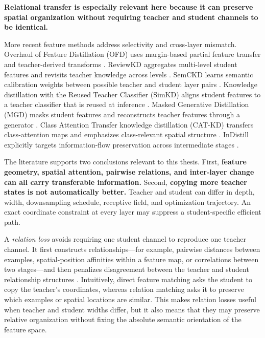 \textbf{Relational transfer is especially relevant here because it can preserve
spatial organization without requiring teacher and student channels to be
identical.}

More recent feature methods address selectivity and cross-layer mismatch.
Overhaul of Feature Distillation (OFD)
uses margin-based partial feature transfer and teacher-derived transforms
\cite{heo2019ofd}. ReviewKD aggregates multi-level student features and
revisits teacher knowledge across levels \cite{chen2021reviewkd}. SemCKD learns
semantic calibration weights between possible teacher and student layer pairs
\cite{chen2021semckd}. Knowledge distillation with the Reused Teacher
Classifier (SimKD) aligns student features to a teacher classifier
that is reused at inference \cite{chen2022simkd}. Masked Generative Distillation
(MGD) masks student features
and reconstructs teacher features through a generator
\cite{yang2022mgd}. Class Attention Transfer knowledge distillation (CAT-KD)
transfers class-attention maps and emphasizes
class-relevant spatial structure \cite{guo2023catkd}. InDistill explicitly
targets information-flow preservation across intermediate stages
\cite{sarridis2025indistill}.

The literature supports two conclusions relevant to this thesis. First,
\textbf{feature geometry, spatial attention, pairwise relations, and inter-layer
change can all carry transferable information.} Second, \textbf{copying more
teacher states is not automatically better.} Teacher and student can differ in
depth, width, downsampling schedule, receptive field, and optimization
trajectory. An exact coordinate constraint at every layer may suppress a
student-specific efficient path.

A \emph{relation loss} avoids requiring one student channel to reproduce one
teacher channel. It first constructs relationships---for example, pairwise
distances between examples, spatial-position affinities within a feature map,
or correlations between two stages---and then penalizes disagreement between
the teacher and student relationship structures
\cite{yim2017fsp,park2019rkd,tung2019similarity}. Intuitively, direct feature
matching asks the student to copy the teacher's coordinates, whereas relation
matching asks it to preserve which examples or spatial locations are similar.
This makes relation losses useful when teacher and student widths differ, but
it also means that they may preserve relative organization without fixing the
absolute semantic orientation of the feature space.


